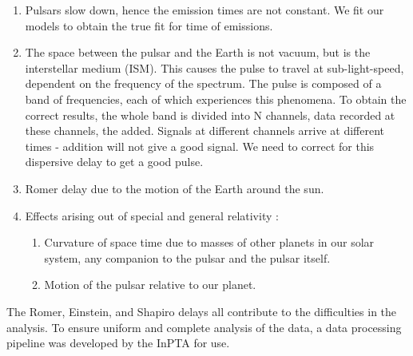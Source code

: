 \documentclass{article}
\begin{document}
\begin{enumerate}
  \item Pulsars slow down, hence the emission times are not constant. We fit our models to obtain the true fit for time of emissions.
  \item The space between the pulsar and the Earth is not vacuum, but is the interstellar medium (ISM). This  causes the pulse to travel at sub-light-speed, dependent on the frequency of the spectrum. The pulse is composed of a band of frequencies, each of which experiences this phenomena. To obtain the correct results,   the whole band is divided into N channels, data recorded at these channels, the added. Signals at different channels arrive at different times - addition will not give a good signal. We need to correct for this dispersive delay to get a good pulse.
  \item Romer delay due to the motion of the Earth around the sun. 
  \item Effects arising out of special and general relativity :
    \begin{enumerate}
        \item Curvature of space time due to masses of other planets in our solar system, any companion to the pulsar and the pulsar itself. 
        \item Motion of the pulsar relative to our planet. 
    \end{enumerate}
\end{enumerate}

The Romer, Einstein, and Shapiro delays all contribute to the difficulties in the analysis. To ensure uniform and complete analysis of the data, a data processing pipeline was developed by the InPTA for use.
\newpage
\end{document}
